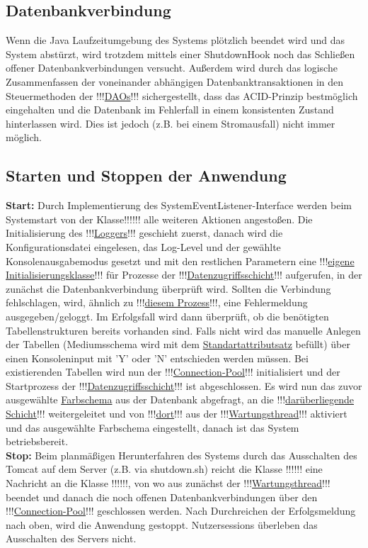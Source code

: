 \documentclass{article}
\begin{document}
\subsection{Datenbankverbindung}
Wenn die Java Laufzeitumgebung des Systems plötzlich beendet wird und das System abstürzt, wird trotzdem mittels einer ShutdownHook noch das Schließen offener Datenbankverbindungen versucht. Außerdem wird durch das logische Zusammenfassen der voneinander abhängigen Datenbanktransaktionen in den Steuermethoden der !!!\hyperlink{}{DAOs}!!! sichergestellt, dass das ACID-Prinzip bestmöglich eingehalten und die Datenbank im Fehlerfall in einem konsistenten Zustand hinterlassen wird. Dies ist jedoch (z.B. bei einem Stromausfall) nicht immer möglich.
\subsection{Starten und Stoppen der Anwendung}
\noindent \textbf{Start:} Durch Implementierung des SystemEventListener-Interface werden beim Systemstart von der Klasse!!!\hyperlink{}{}!!! alle weiteren Aktionen angestoßen. Die Initialisierung des !!!\hyperlink{}{Loggers}!!! geschieht zuerst, danach wird die Konfigurationsdatei eingelesen, das Log-Level und der gewählte Konsolenausgabemodus gesetzt und mit den restlichen Parametern eine !!!\hyperlink{}{eigene Initialisierungsklasse}!!! für Prozesse der !!!\hyperlink{}{Datenzugriffsschicht}!!! aufgerufen, in der zunächst die Datenbankverbindung überprüft wird. Sollten die Verbindung fehlschlagen, wird, ähnlich zu !!!\hyperlink{}{diesem Prozess}!!!, eine Fehlermeldung ausgegeben/geloggt. Im Erfolgsfall wird dann überprüft, ob die benötigten Tabellenstrukturen bereits vorhanden sind. Falls nicht wird das manuelle Anlegen der Tabellen (Mediumsschema wird mit dem \hyperlink{Standartattributsatz}{Standartattributsatz} befüllt) über einen Konsoleninput mit 'Y' oder 'N' entschieden werden müssen. Bei existierenden Tabellen wird  nun der !!!\hyperlink{}{Connection-Pool}!!! initialisiert und der Startprozess der !!!\hyperlink{}{Datenzugriffsschicht}!!! ist abgeschlossen. Es wird nun das zuvor ausgewählte \hyperlink{Farbschemaattribut}{Farbschema} aus der Datenbank abgefragt, an die !!!\hyperlink{}{darüberliegende Schicht}!!! weitergeleitet und von !!!\hyperlink{}{dort}!!! aus der !!!\hyperlink{}{Wartungsthread}!!! aktiviert und das ausgewählte Farbschema eingestellt, danach ist das System betriebsbereit. \\
\textbf{Stop:}
Beim planmäßigen Herunterfahren des Systems durch das Ausschalten des Tomcat auf dem Server (z.B. via shutdown.sh) reicht die Klasse !!!\hyperlink{}{}!!! eine Nachricht an die Klasse !!!\hyperlink{}{}!!!, von wo aus zunächst der !!!\hyperlink{}{Wartungsthread}!!! beendet und danach die noch offenen Datenbankverbindungen über den !!!\hyperlink{}{Connection-Pool}!!! geschlossen werden. Nach Durchreichen der Erfolgsmeldung nach oben, wird die Anwendung gestoppt. Nutzersessions überleben das Ausschalten des Servers nicht.
\end{document}
